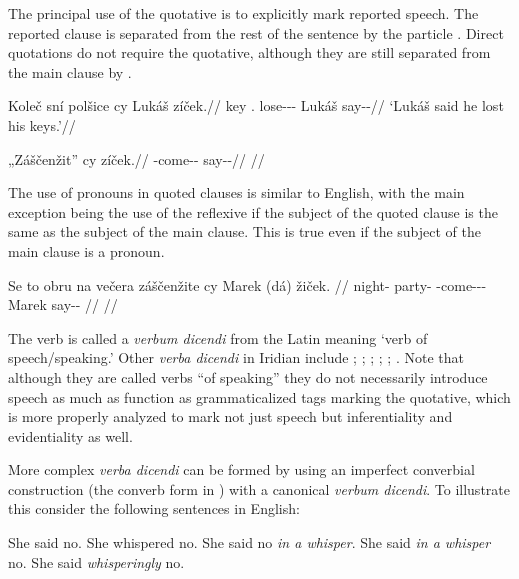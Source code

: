 The principal use of the quotative is to explicitly mark reported speech. The
reported clause is separated from the rest of the sentence by the particle
. Direct quotations do not require the quotative, although they are
still separated from the main clause by .

\pex
  \begingl
    \gla Koleč sní polšice cy Lukáš zíček.//
    \glb key \Refl{}.\Acc{} lose-\Av{}-\Pf{}-\Quot{} \Qp{} Lukáš say-\Av{}-\Pf{}//
    \glft ‘Lukáš said he lost his keys.’//
  \endgl
\xe

\pex
  \begingl
    \gla „Záščenžit” cy zíček.//
    \glb \First{}\Sg{} \Neg{}-come-\Av{}-\SupP{} \Qp{} say-\Av{}-\Pf{}//
    \glft {}//
  \endgl
\xe

The use of pronouns in quoted clauses is similar to English, with the main
exception being the use of the reflexive  if the subject of the quoted
clause is the same as the subject of the main clause. This is true even if the
subject of the main clause is a pronoun.

\pex
  \begingl
    \gla Se to obru na večera záščenžite cy Marek (dá) žiček. //
    \glb \Refl{} \Dem{} night-\Ins{} \Loc{} party-\Acc{} \Neg{}-come-\Av{}-\SupP{}-\Quot{} \Qp{} Marek \First\Sg{} say-\Av{}-\Pf{} //
    \glft {}//
  \endgl
\xe

The verb  is called a \emph{verbum dicendi} from the Latin meaning ‘verb of speech/speaking.’ Other \emph{verba
dicendi} in Iridian include ; ;
; ; ;
. Note that although they are called
verbs ``of speaking'' they do not necessarily introduce speech as much as
function as grammaticalized tags marking the quotative,  which is more properly
analyzed to mark not just speech but inferentiality and evidentiality as well.

More complex \emph{verba dicendi} can be formed by using an imperfect converbial
construction (the converb form in ) with a canonical \emph{verbum
dicendi}. To illustrate this consider the following sentences in English:

\pex[*=?*,interpartskip=0pt]
\a\label{ex:vd1} She said no.
\a\label{ex:vd2} She whispered no.
\a\label{ex:vd3} She said no \emph{in a whisper}.
\a\label{ex:vd4}  She said \emph{in a whisper} no.
\a\label{ex:vd5}  She said \emph{whisperingly} no.
\xe


